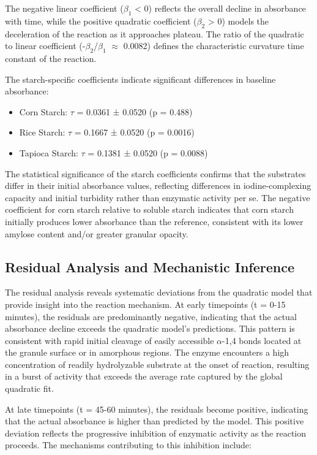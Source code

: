 \documentclass[
  12pt,
]{article}
\begin{document}
The negative linear coefficient (\(\beta_1\) \textless{} 0) reflects the
overall decline in absorbance with time, while the positive quadratic
coefficient (\(\beta_2\) \textgreater{} 0) models the deceleration of
the reaction as it approaches plateau. The ratio of the quadratic to
linear coefficient (-\(\beta_2\)/\(\beta_1\) \(\approx\) 0.0082) defines
the characteristic curvature time constant of the reaction.

The starch-specific coefficients indicate significant differences in
baseline absorbance:

\begin{itemize}
\item
  Corn Starch: \(\tau\) = 0.0361 ± 0.0520 (p = 0.488)
\item
  Rice Starch: \(\tau\) = 0.1667 ± 0.0520 (p = 0.0016)
\item
  Tapioca Starch: \(\tau\) = 0.1381 ± 0.0520 (p = 0.0088)
\end{itemize}

The statistical significance of the starch coefficients confirms that
the substrates differ in their initial absorbance values, reflecting
differences in iodine-complexing capacity and initial turbidity rather
than enzymatic activity per se. The negative coefficient for corn starch
relative to soluble starch indicates that corn starch initially produces
lower absorbance than the reference, consistent with its lower amylose
content and/or greater granular opacity.

\subsection{Residual Analysis and Mechanistic
Inference}\label{residual-analysis-and-mechanistic-inference}

The residual analysis reveals systematic deviations from the quadratic
model that provide insight into the reaction mechanism. At early
timepoints (t = 0-15 minutes), the residuals are predominantly negative,
indicating that the actual absorbance decline exceeds the quadratic
model's predictions. This pattern is consistent with rapid initial
cleavage of easily accessible \(\alpha\)-1,4 bonds located at the
granule surface or in amorphous regions. The enzyme encounters a high
concentration of readily hydrolyzable substrate at the onset of
reaction, resulting in a burst of activity that exceeds the average rate
captured by the global quadratic fit.

At late timepoints (t = 45-60 minutes), the residuals become positive,
indicating that the actual absorbance is higher than predicted by the
model. This positive deviation reflects the progressive inhibition of
enzymatic activity as the reaction proceeds. The mechanisms contributing
to this inhibition include:
\end{document}
